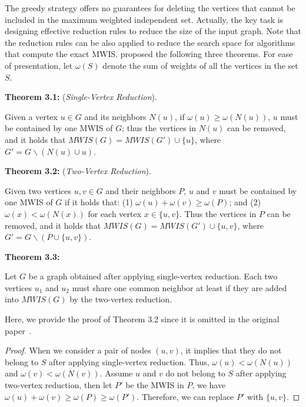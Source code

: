 \documentclass[sigconf, nonacm]{acmart}
\begin{document}
The greedy strategy offers no guarantees for deleting the vertices that cannot be included in the maximum weighted independent set. Actually, the key task is designing effective reduction rules to reduce the size of the input graph. Note that the reduction rules can be also applied to reduce the search space for algorithms that compute the exact MWIS. \citet{Zheng:2020aa} proposed the following three theorems. For ease of presentation, let $\omega(S)$ denote the sum of weights of all the vertices in the set $S$.

\begin{framed}
\noindent\textbf{Theorem 3.1:} (\emph{Single-Vertex Reduction}). 

Given a vertex $u\in G$ and its neighbors $N(u)$, if $\omega(u)\geq\omega(N(u))$, $u$ must be contained by one MWIS of $G$; thus the vertices in $N(u)$ can be removed, and it holds that $MWIS(G)=MWIS(G')\cup\{u\}$, where $G'= G\backslash(N(u)\cup u)$.

\noindent\textbf{Theorem 3.2:} (\emph{Two-Vertex Reduction}). 

Given two vertices $u, v\in G$ and their neighbors $P$, $u$ and $v$ must be contained by one MWIS of $G$ if it holds that: (1) $\omega(u)+\omega(v)\geq\omega(P)$; and (2) $\omega(x)<\omega(N(x))$ for each vertex $x\in\{u,v\}$. Thus the vertices in $P$ can be removed, and it holds that $MWIS(G)=MWIS(G')\cup\{u,v\}$, where $G'=G\backslash(P\cup\{u,v\})$.

\noindent\textbf{Theorem 3.3:}

Let $G$ be a graph obtained after applying single-vertex reduction. Each two vertices $u_1$ and $u_2$ must share one common neighbor at least if they are added into $MWIS(G)$ by the two-vertex reduction.
\end{framed}

Here, we provide the proof of Theorem 3.2 since it is omitted in the original paper~\cite{Zheng:2020aa}.

\begin{proof}
When we consider a pair of nodes $(u, v)$, it implies that they do not belong to $S$ after applying single-vertex reduction. Thus, $\omega(u)<\omega(N(u))$ and $\omega(v)<\omega(N(v))$. Assume $u$ and $v$ do not belong to $S$ after applying two-vertex reduction, then let $P'$ be the MWIS in $P$, we have $\omega(u)+\omega(v)\geq\omega(P)\geq\omega(P')$. Therefore, we can replace $P'$ with $\{u, v\}$. %
\end{proof}
\end{document}
